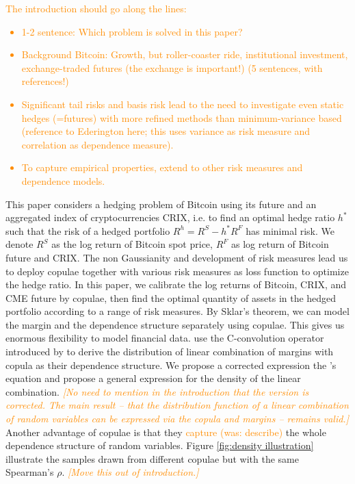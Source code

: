 \documentclass[11pt,a4paper,english]{article}
\providecommand{\natp}[1]{\textcolor{darkorange}{#1}}
\begin{document}
\natp{The introduction should go along the lines:
  \begin{itemize}
  \item 1-2 sentence: Which problem is solved in this paper?
  \item Background Bitcoin: Growth, but roller-coaster ride, institutional investment,
    exchange-traded futures (the exchange is important!) (5 sentences,
    with references!)
  \item Significant tail risks and basis risk lead to the need to
    investigate even static hedges (=futures) with more refined
    methods than minimum-variance based (reference to Ederington
    here; this uses variance as risk measure and correlation as
    dependence measure).
  \item To capture empirical properties, extend to other risk measures
    and dependence models. 
  \end{itemize}
  }

This paper considers a hedging problem of Bitcoin using its future and an aggregated index of cryptocurrencies CRIX,
i.e. to find an optimal hedge ratio $h^*$ such that the risk of a hedged portfolio $R^h = R^S - h^*R^F$ has
minimal risk.
We denote $R^S$ as the log return of Bitcoin spot price, $R^F$ as log return of Bitcoin future and CRIX.
The non Gaussianity and development of risk measures lead us to deploy copulae together with various risk measures as loss function to optimize the hedge ratio.
In this paper, we calibrate the log returns of Bitcoin, CRIX, and CME future by copulae,
then find the optimal quantity of assets in the hedged portfolio according to a range of risk measures.
By Sklar's theorem, we can model the margin and the dependence structure separately using copulae.
This gives us enormous flexibility to model financial data.
\citet{barbi2014copula} use the C-convolution operator introduced by \citet{cherubini2011copula} to derive the distribution
of linear combination of margins with copula as their dependence structure.
We propose a corrected expression the \citet{barbi2014copula}'s equation and propose a general expression for the density of the linear
combination. \natp{\em [No need to mention in the introduction that
  the version is corrected. The main result -- that the distribution
  function of a linear combination of random variables can be
  expressed via the copula and margins -- remains valid.]}\medskip
Another advantage of copulae is that they \natp{capture (was: describe)} the whole dependence structure of random variables.
Figure \ref{fig:density illustration} illustrate the samples drawn
from different copulae but with the same Spearman's $\rho$. \natp{\em
  [Move this out of introduction.]}
\end{document}
